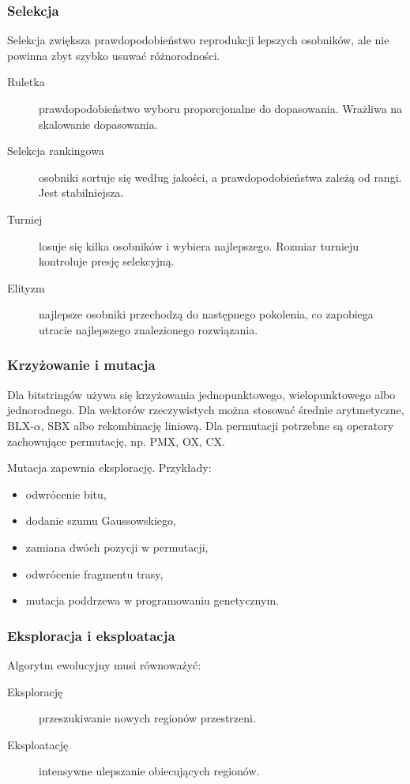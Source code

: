 \subsubsection{Selekcja}

Selekcja zwiększa prawdopodobieństwo reprodukcji lepszych osobników, ale nie powinna zbyt szybko usuwać różnorodności.

\begin{description}
  \item[Ruletka] prawdopodobieństwo wyboru proporcjonalne do dopasowania. Wrażliwa na skalowanie dopasowania.
  \item[Selekcja rankingowa] osobniki sortuje się według jakości, a prawdopodobieństwa zależą od rangi. Jest stabilniejsza.
  \item[Turniej] losuje się kilka osobników i wybiera najlepszego. Rozmiar turnieju kontroluje presję selekcyjną.
  \item[Elityzm] najlepsze osobniki przechodzą do następnego pokolenia, co zapobiega utracie najlepszego znalezionego rozwiązania.
\end{description}

\subsubsection{Krzyżowanie i mutacja}

Dla bitstringów używa się krzyżowania jednopunktowego, wielopunktowego albo jednorodnego. Dla wektorów rzeczywistych można stosować średnie arytmetyczne, BLX-$\alpha$, SBX albo rekombinację liniową. Dla permutacji potrzebne są operatory zachowujące permutację, np. PMX, OX, CX.

Mutacja zapewnia eksplorację. Przykłady:
\begin{itemize}
  \item odwrócenie bitu,
  \item dodanie szumu Gaussowskiego,
  \item zamiana dwóch pozycji w permutacji,
  \item odwrócenie fragmentu trasy,
  \item mutacja poddrzewa w programowaniu genetycznym.
\end{itemize}

\subsubsection{Eksploracja i eksploatacja}

Algorytm ewolucyjny musi równoważyć:
\begin{description}
  \item[Eksplorację] przeszukiwanie nowych regionów przestrzeni.
  \item[Eksploatację] intensywne ulepszanie obiecujących regionów.
\end{description}


